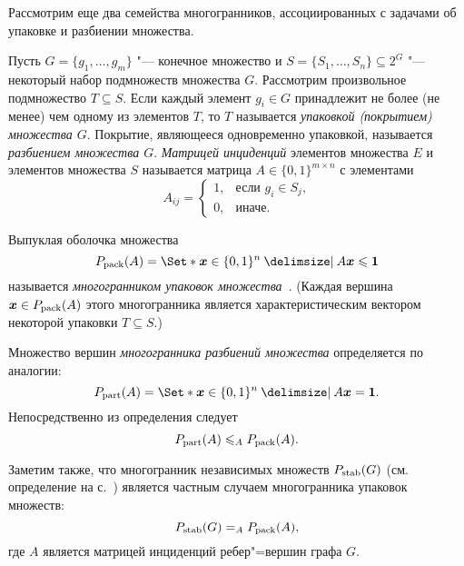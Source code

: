 Рассмотрим еще два семейства многогранников, ассоциированных с задачами об упаковке и разбиении множества.

Пусть $G = \{g_1, \ldots, g_m\}$ "--- конечное множество
и $S = \{S_1, \ldots, S_n\} \subseteq 2^G$ "--- некоторый набор подмножеств множества $G$.
Рассмотрим произвольное подмножество $T \subseteq S$.
Если каждый элемент $g_i \in G$ принадлежит не более (не менее) чем одному из элементов $T$, то $T$ называется \emph{упаковкой (покрытием) множества $G$}.
Покрытие, являющееся одновременно упаковкой, называется \emph{разбиением множества $G$}.
\emph{Матрицей инциденций} элементов множества $E$ и элементов множества $S$ называется матрица $A\in\{0,1\}^{m\times n}$ с элементами
\[
A_{ij} = 
\begin{cases}
1, &\text{если $g_i\in S_j$,}\\
0, &\text{иначе.}
\end{cases}
\]


Выпуклая \hypertarget{def:Pack}{оболочка} множества
\begin{equation*}
\Pack(A) = \Set*{\bm{x}\in\{0,1\}^n \given A \bm{x} \le \bm{1}}
\end{equation*}
называется \emph{многогранником упаковок множества}~\cite{Balas:1976}.
(Каждая вершина $\bm{x} \in P_{\textup{pack}}(A)$ этого многогранника является характеристическим вектором некоторой упаковки $T \subseteq S$.)

Множество вершин \emph{многогранника разбиений множества} определяется по аналогии:
\begin{equation}
\label{eq:Part}
\Part(A) = \Set*{\bm{x}\in\{0,1\}^n \given A \bm{x} = \bm{1}}.
\end{equation}
Непосредственно из определения следует
\begin{equation}
\label{eq:PartPack}
P_{\textup{part}}(A) \leqslant_A P_{\textup{pack}}(A).
\end{equation}

Заметим также, что многогранник независимых множеств $P_{\textup{stab}}(G)$ (см. определение на с.~\hyperlink{Stable}{\pageref*{def:Stable}}) является частным случаем многогранника упаковок множеств:
\begin{equation}
\label{eq:StablePack}
P_{\textup{stab}}(G) =_A P_{\textup{pack}}(A),
\end{equation}
где $A$ является матрицей инциденций ребер"=вершин графа $G$.


